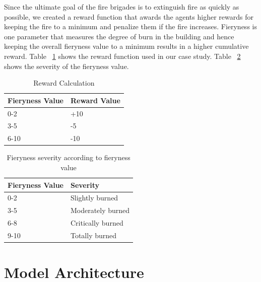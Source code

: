 \documentclass[12pt]{report}
\begin{document}
Since the ultimate goal of the fire brigades is to extinguish fire as quickly as possible, we created a reward function that awards the agents higher rewards for keeping the fire to a minimum and penalize them if the fire increases. Fieryness is one parameter that measures the degree of burn in the building and hence keeping the overall fieryness value to a minimum results in a higher cumulative reward. Table ~\ref{table:RewardsTable} shows the reward function used in our case study. Table ~\ref{table:FierynessSeverity} shows the severity of the fieryness value. 
     
\begin{table} [!h]
\begin{center}
 \begin{tabular}{l | l} 
 \hline
 Fieryness Value & Reward Value  \\ [0.5ex] 
 \hline\hline
 0-2 & +10 \\
 3-5 & -5\\
 6-10 & -10  \\ 
 \hline
\end{tabular}
\caption{Reward Calculation}
\label{table:RewardsTable}
\end{center}
\end{table}
 
 
\begin{table} [!h]
\begin{center}
 \begin{tabular}{l | l} 
 \hline
 Fieryness Value & Severity  \\ [0.5ex] 
 \hline\hline
 0-2 & Slightly burned \\
 3-5 & Moderately burned\\
 6-8 & Critically burned\\ 
 9-10 & Totally burned\\
 \hline
\end{tabular}
\caption{Fieryness severity according to fieryness value}
\label{table:FierynessSeverity}
\end{center}
\end{table}

\section{Model Architecture}
\end{document}
